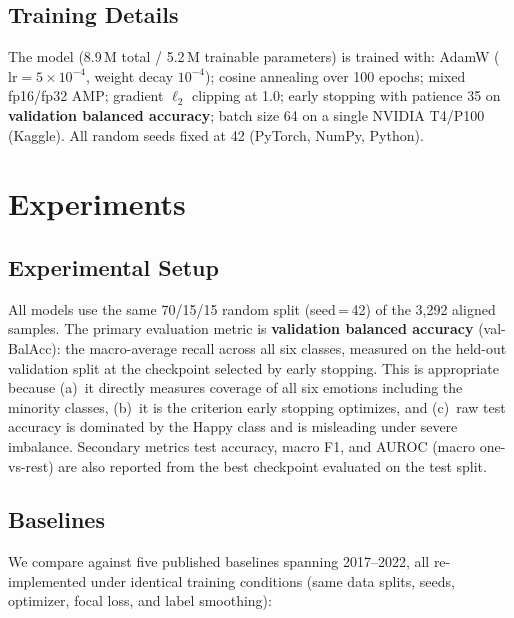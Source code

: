 \documentclass[conference]{IEEEtran}
\begin{document}
\subsection{Training Details}
\label{sec:training_details}

The model (8.9\,M total / 5.2\,M trainable parameters) is trained with:
AdamW ($\mathrm{lr}=5\times10^{-4}$, weight decay $10^{-4}$); cosine annealing
over 100 epochs; mixed fp16/fp32 AMP; gradient $\ell_2$ clipping at 1.0;
early stopping with patience 35 on \textbf{validation balanced accuracy};
batch size 64 on a single NVIDIA T4/P100 (Kaggle).  All random seeds fixed at
42 (PyTorch, NumPy, Python).

\section{Experiments}
\label{sec:experiments}

\subsection{Experimental Setup}

All models use the same 70/15/15 random split (seed\,=\,42) of the 3{,}292
aligned samples.  The primary evaluation metric is \textbf{validation balanced
accuracy} (val-BalAcc): the macro-average recall across all six classes,
measured on the held-out validation split at the checkpoint selected by early
stopping.  This is appropriate because (a)~it directly measures coverage of all
six emotions including the minority classes, (b)~it is the criterion early
stopping optimizes, and (c)~raw test accuracy is dominated by the Happy class
and is misleading under severe imbalance.  Secondary metrics test accuracy,
macro F1, and AUROC (macro one-vs-rest) are also reported from the best
checkpoint evaluated on the test split.

\subsection{Baselines}

We compare against five published baselines spanning 2017--2022, all
re-implemented under identical training conditions (same data splits, seeds,
optimizer, focal loss, and label smoothing):
\end{document}
